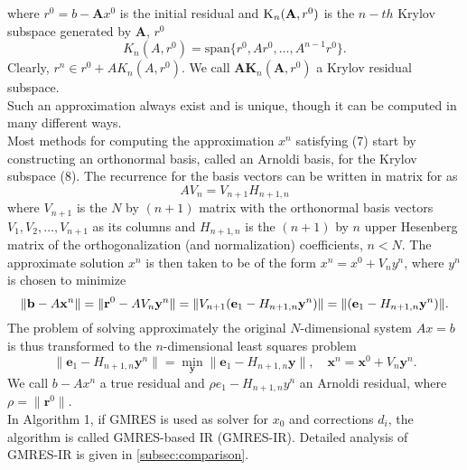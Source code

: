 where $r^0=b-\textbf{A}x^0$ is the initial residual and $\textsc{K}_n(\textbf{A},r^0)$ is the $n-th$ Krylov subspace generated by \textbf{A}, $r^0$
\begin{equation}
    K_n(A, r^0) = \text{span}\{r^0, Ar^0, \dots, A^{n-1}r^0\}.
\end{equation}
Clearly, $r^n \in r^0 + A K_n(A, r^0)$. We call $\textbf{AK}_{n}(\textbf{A},r^0)$ a Krylov residual subspace. \\
Such an approximation always exist and is unique, though it can be computed in many different ways. \\
Most methods for computing the approximation $x^n$ satisfying (7) start by constructing an orthonormal basis, called an Arnoldi basis, for the Krylov subspace  (8). The recurrence for the basis vectors can be written in matrix for as 
\begin{equation}
    AV_n=V_{n+1}H_{n+1,n}
\end{equation}
where $V_{n+1}$ is the $N$ by $(n+1)$ matrix with the orthonormal basis vectors $V_1,V_2,\dots,V_{n+1}$ as its columns and $H_{n+1,n}$ is the $(n+1)$ by $n$ upper Hesenberg matrix of the orthogonalization (and normalization) coefficients, $n<N$. 
The approximate solution $x^n$ is then taken to be of the form $x^n=x^0+V_ny^n$, where $y^n$ is chosen to minimize
\begin{equation}
    \| \mathbf{b} - A\mathbf{x}^n \| = \| \mathbf{r}^0 - AV_n\mathbf{y}^n \| \\
= \| V_{n+1}(\mathbf{e}_1 - H_{n+1,n}\mathbf{y}^n) \| \\
= \| (\mathbf{e}_1 - H_{n+1,n}\mathbf{y}^n) \|.
\end{equation}
The problem of solving approximately the original $N$-dimensional system $Ax=b$ is thus transformed to the $n$-dimensional least squares problem
\begin{equation}
    \| \mathbf{e}_1 - H_{n+1,n}\mathbf{y}^n \| = \min_{\mathbf{y}} \| \mathbf{e}_1 - H_{n+1,n}\mathbf{y} \|, \quad \mathbf{x}^n = \mathbf{x}^0 + V_n\mathbf{y}^n.
\end{equation}
We call $b-Ax^n$ a true residual and $\rho e_1 - H_{n+1,n}y^n$ an Arnoldi residual, where $\rho = \|\mathbf{r}^0\|$.\\

In Algorithm 1, if GMRES is used as solver for $x_0$ and corrections $d_i$, the algorithm is called GMRES-based IR (GMRES-IR). Detailed analysis of GMRES-IR is given in \ref{subsec:comparison}.

